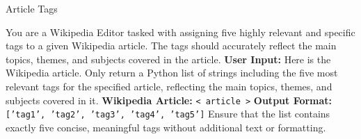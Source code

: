
\begin{figure*}[t]
    \begin{AIbox}{Article Tags}
    \parbox[t]{\textwidth}{
        You are a Wikipedia Editor tasked with assigning five highly relevant and specific tags to a given Wikipedia article. \newline
        The tags should accurately reflect the main topics, themes, and subjects covered in the article. \newline
        \newline
        \textbf{User Input:} \newline
        Here is the Wikipedia article. Only return a Python list of strings including the five most relevant tags for the specified article, reflecting the main topics, themes, and subjects covered in it. \newline
        \newline
        \textbf{Wikipedia Article:} \texttt{< {article} >} \newline
        \newline
        \textbf{Output Format:} \newline
        \texttt{['tag1', 'tag2', 'tag3', 'tag4', 'tag5']} \newline
        \newline
        Ensure that the list contains exactly five concise, meaningful tags without additional text or formatting.
    }
    \end{AIbox}
    \caption{Prompt template for extracting five relevant tags for a Wikipedia article.}
    \label{fig:wikipedia_tagging_prompt}
\end{figure*}



